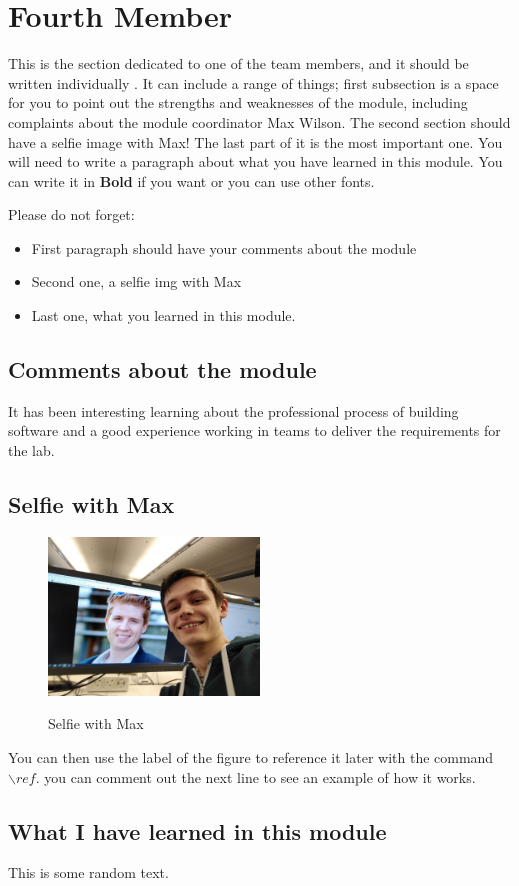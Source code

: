 \section{Fourth Member}
This is the section dedicated to one of the team members, and it should be written individually . It can include a range of things; first subsection is a space for you to point out the strengths and weaknesses of the module, including complaints about the module coordinator Max Wilson. The second section should have a selfie image with Max! The last part of it is the most important one. You will need to write a paragraph about what you have learned in this module. You can write it in \textbf{Bold} if you want or you can use other fonts. 

Please do not forget:
\begin{itemize}
	\item First paragraph should have your comments about the module
	\item Second one, a selfie img with Max
	\item Last one, what you learned in this module.
\end{itemize}

\subsection{Comments about the module}
It has been interesting learning about the professional process of building software and a good experience working in teams to deliver the requirements for the lab.


\subsection{Selfie with Max}
\begin{figure}[h]
\caption{Selfie with Max}
\centering
\includegraphics[width=0.5\textwidth]{psytb5_selfie}
\label{fig:selfie}
\end{figure}

You can then use the label of the figure to reference it later with the command ${\backslash}ref$. you can comment out the next line to see an example of how it works.


\subsection{What I have learned in this module}
This is some random text.

